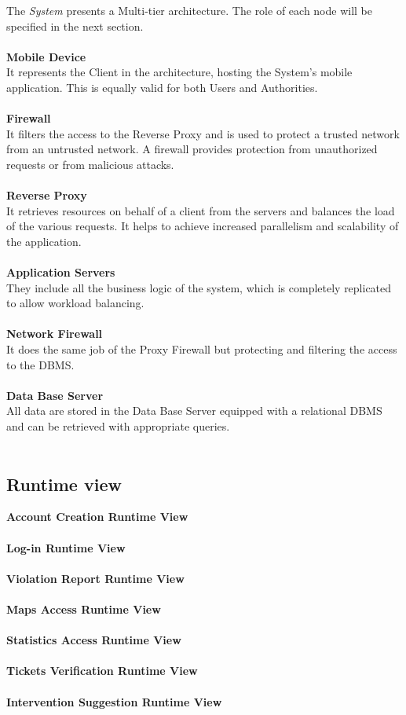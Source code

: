 \documentclass{article}
\begin{document}
	The {\it System} presents a Multi-tier architecture. The role of each node will be specified in the next section. \\ \\
			{\bf Mobile Device} \\
			It represents the Client in the architecture, hosting the System’s mobile application. This is equally valid for both Users and Authorities. \\ \\
			{\bf Firewall}\\
			It filters the access to the Reverse Proxy and is used to protect a trusted network from an untrusted network. A firewall provides protection from unauthorized requests or from malicious attacks. \\ \\
			{\bf Reverse Proxy}\\
			It retrieves resources on behalf of a client from the servers and balances the load of the various requests. It helps to achieve increased parallelism and scalability of the application. \\ \\
			{\bf Application Servers}\\
			They include all the business logic of the system, which is completely replicated to allow workload balancing. \\ \\
			{\bf Network Firewall}\\
			It does the same job of the Proxy Firewall but protecting and filtering the access to the DBMS. \\ \\
			{\bf Data Base Server}\\
			All data are stored in the Data Base Server equipped with a relational DBMS and can be retrieved with appropriate queries. \\ \\
	

	\subsection{Runtime view}
	
	{\bf Account Creation Runtime View}
	\\ \\
	{\bf Log-in Runtime View}
	\\ \\
	{\bf Violation Report Runtime View}
	\\ \\
	{\bf Maps Access Runtime View}
	\\ \\
	{\bf Statistics Access Runtime View}
	\\ \\
	{\bf Tickets Verification Runtime View}
	\\ \\ 
	{\bf Intervention Suggestion Runtime View}
	
\end{document}
